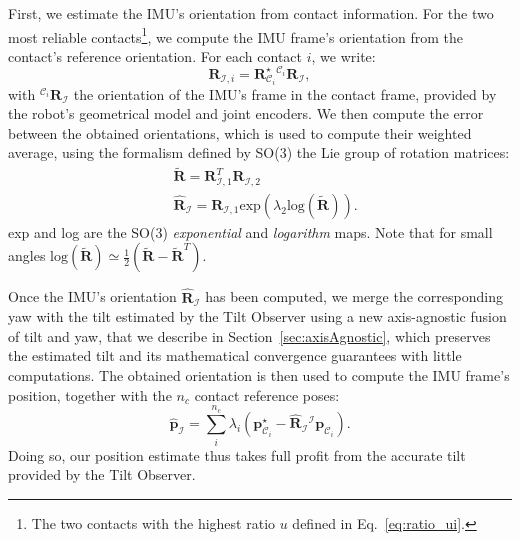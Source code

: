 \documentclass{IJCAS}
\begin{document}
First, we estimate the IMU's orientation from contact information. For the two most reliable contacts\footnote{The two contacts with the highest ratio $u$ defined in Eq.~\eqref{eq:ratio_ui}.}, we compute the IMU frame's orientation from the contact's reference orientation. For each contact $i$, we write:
\begin{equation}
    \boldsymbol{R}_{\mathcal{I}, i} = \boldsymbol{R}^{\star}_{\mathcal{C}_{i}} {}^{\mathcal{C}_{i}} \boldsymbol{R}_{\mathcal{I}}, \label{eq:R_I_i}
\end{equation}
with ${}^{\mathcal{C}_{i}} \boldsymbol{R}_{\mathcal{I}}$ the orientation of the IMU's frame in the contact frame, provided by the robot's geometrical model and joint encoders.
We then compute the error between the obtained orientations, which is used to compute their weighted average, using the formalism defined by SO(3) the Lie group of rotation matrices:
\begin{align}
    &\tilde{\boldsymbol{R}} = \boldsymbol{R}^{T}_{\mathcal{I}, 1} \boldsymbol{R}_{\mathcal{I}, 2}  \\
 & \hat{\boldsymbol{R}}_{\mathcal{I}} = \boldsymbol{R}_{\mathcal{I}, 1} \text{exp} \left( \lambda_{2}\text{log} \left( \tilde{\boldsymbol{R}}\right)  \right). \label{eq:leg_odom_avg_ori}
\end{align}
exp and log are the SO(3) \emph{exponential} and \emph{logarithm} maps. Note that for small angles  
$\text{log}\left(\tilde{\boldsymbol{R}}\right) \simeq \frac{1}{2} \left(\tilde{\boldsymbol{R}}-\tilde{\boldsymbol{R}}^{T}\right) $.

Once the IMU's orientation $\hat{\boldsymbol{R}}_{\mathcal{I}}$ has been computed, we merge the corresponding yaw with the tilt estimated by the Tilt Observer using a new axis-agnostic fusion of tilt and yaw, that we describe in Section~\ref{sec:axisAgnostic}, which preserves the estimated tilt and its mathematical convergence guarantees with little computations. The obtained orientation is then used to compute the IMU frame’s position, together with the $n_{c}$ contact reference poses: 
\begin{equation}
    \hat{\boldsymbol{p}}_{\mathcal{I}} = \sum^{n_{c}}_{i} \lambda_{i} \left( \boldsymbol{p}^{\star}_{{\mathcal{C}}_{i}} - \hat{\boldsymbol{R}}_{\mathcal{I}} {}^{\mathcal{I}}\boldsymbol{p}_{{\mathcal{C}}_{i}} \right). \label{eq:est_p_imu}
\end{equation}
Doing so, our position estimate thus takes full profit from the accurate tilt provided by the Tilt Observer.
\end{document}
